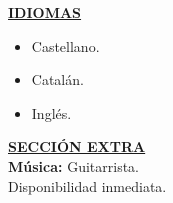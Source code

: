 \documentclass{article}
\begin{document}
	\noindent \textbf{\underline{IDIOMAS}} \\
	\begin{itemize}[noitemsep,nolistsep,leftmargin=*]
		\item {Castellano.}
		\item {Catalán.}
		\item {Inglés. \\}
	\end{itemize}
	

	\noindent \textbf{\underline{SECCIÓN EXTRA}} \\
	\noindent \textbf{Música:} Guitarrista. \\
	\noindent Disponibilidad inmediata. 
	
	
\end{document}
